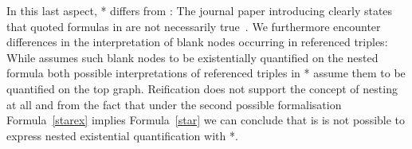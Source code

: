In this last aspect, \rdf{}* differs from \nthree: The journal paper introducing \nthree clearly states that quoted formulas in \nthree are not necessarily true~\cite[p 11]{N3Logic}. 
We furthermore encounter differences in the interpretation of blank nodes occurring in referenced triples: While \nthree assumes such blank nodes to be existentially quantified 
on the nested formula both possible interpretations of referenced triples in \rdf{}* assume them to be quantified on the top graph.
% 
% 
% 
Reification does not support the concept of nesting at all and from the fact that under the second possible formalisation
Formula~\ref{starex} implies Formula~\ref{star} we can conclude that is is not possible to express nested existential quantification with \rdf{}*.
% 

